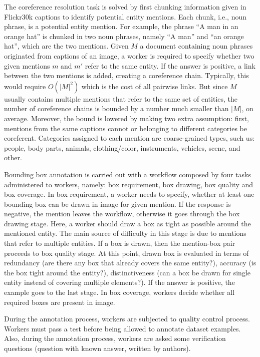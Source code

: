 The coreference resolution task is solved by first chunking
information given in Flickr30k captions to identify potential entity
mentions. Each chunk, i.e., noun phrase, is a potential entity
mention. For example, the phrase ``A man in an orange hat'' is chunked
in two noun phrases, namely ``A man'' and ``an orange hat'', which are
the two mentions. Given $M$ a document containing noun phrases
originated from captions of an image, a worker is required to specify
whether two given mentions $m$ and $m'$ refer to the same entity. If
the answer is positive, a link between the two mentions is added,
creating a coreference chain. Typically, this would require $O(|M|^2)$
which is the cost of all pairwise links. But since $M$ usually
contains multiple mentions that refer to the same set of entities, the
number of coreference chains is bounded by a number much smaller than
$|M|$, on average. Moreover, the bound is lowered by making two extra
assumption: first, mentions from the same captions cannot or belonging
to different categories be coreferent. Categories assigned to each
mention are coarse-grained types, such us: people, body parts,
animals, clothing/color, instruments, vehicles, scene, and other.

Bounding box annotation is carried out with a workflow composed by
four tasks administered to workers, namely: box requirement, box
drawing, box quality and box coverage. In box requirement, a worker
needs to specify, whether at least one bounding box can be drawn in
image for given mention. If the response is negative, the mention
leaves the workflow, otherwise it goes through the box drawing stage.
Here, a worker should draw a box as tight as possible around the
mentioned entity. The main source of difficulty in this stage is due
to mentions that refer to multiple entities. If a box is drawn, then
the mention-box pair proceeds to box quality stage. At this point,
drawn box is evaluated in terms of redundancy (are there any box that
already covers the same entity?), accuracy (is the box tight around
the entity?), distinctiveness (can a box be drawn for single entity
instead of covering multiple elements?). If the answer is positive,
the example goes to the last stage. In box coverage, workers decide
whether all required boxes are present in image. 

During the annotation process, workers are subjected to quality
control process. Workers must pass a test before being allowed to
annotate dataset examples. Also, during the annotation process,
workers are asked some verification questions (question with known
answer, written by authors).

